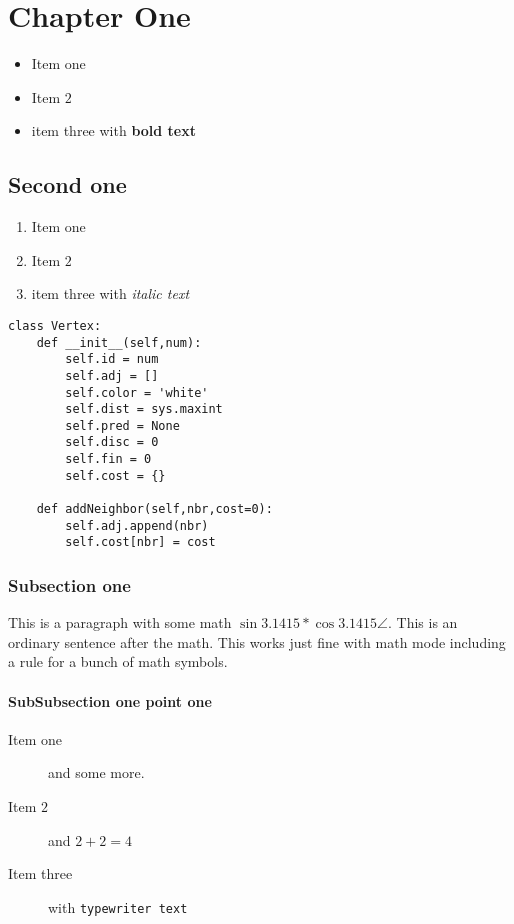 \documentclass[letter]{article}
\begin{document}
\maketitle
\chapter{Chapter One}



\begin{itemize}
    \item Item one
    \item Item $2$
    \item item three with \textbf{bold text}
\end{itemize}

\section{Second one}
\begin{enumerate}
    \item Item one
    \item Item $2$
    \item item three with \textit{italic text}
\end{enumerate}

\begin{lstlisting}[caption=The Vertex Class,label=lst:vertex,float=htbp]
class Vertex:
    def __init__(self,num):
        self.id = num
        self.adj = []
        self.color = 'white'
        self.dist = sys.maxint
        self.pred = None
        self.disc = 0
        self.fin = 0
        self.cost = {}

    def addNeighbor(self,nbr,cost=0):
        self.adj.append(nbr)
        self.cost[nbr] = cost
\end{lstlisting}

\subsection{Subsection one}\label{sec:testLabel}
This is a paragraph with some math $ \sin{3.1415} * \cos{3.1415} \angle  $.  This is an ordinary sentence after the math.  This works just fine with math mode including a rule for a bunch of math symbols.

\subsubsection{SubSubsection one point one}
\begin{description}
    \item[Item one]  and some more.
    \item[Item $2$] and $2+2 = 4$
    \item[Item three] with \texttt{typewriter text}
\end{description}
\end{document}
